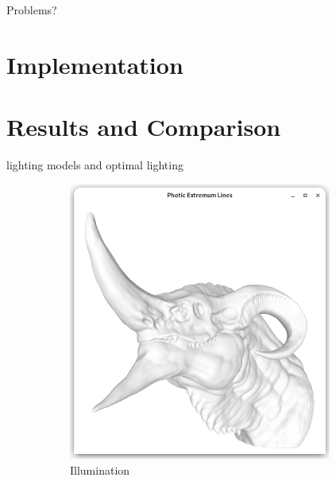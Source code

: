 \documentclass[9pt,fleqn,twoside,twocolumn]{stdglobal}
\begin{document}
    Problems?

\section{Implementation}

\section{Results and Comparison}

  lighting models and optimal lighting

  \begin{figure}[h]
      \centering
      \begin{subfigure}[b]{0.24\textwidth}
        \centering
        \includegraphics[width=0.95\textwidth,trim={15px 15 15 50},clip]{images/dragon-head-viewer-shader.png}
        \caption{Illumination}
      \end{subfigure}%
      \hfill%
      \begin{subfigure}[b]{0.24\textwidth}
        \centering

\end{subfigure}
\end{figure}
\end{document}
